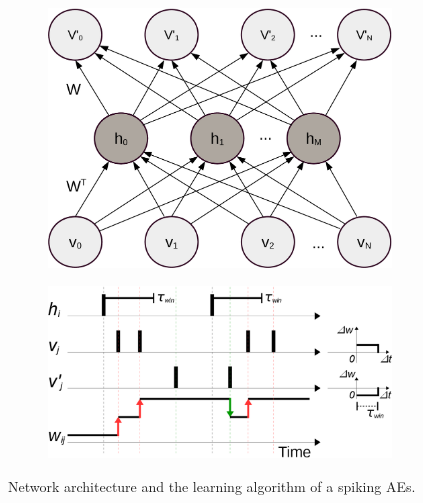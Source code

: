 \begin{figure}[th]
	\centering
	\begin{subfigure}[t]{0.35\textwidth}
		\includegraphics[width=\textwidth]{pics_sdlm/AE.png}
	\end{subfigure}
	\begin{subfigure}[t]{0.6\textwidth}
		\includegraphics[width=\textwidth]{pics_sdlm/rSTDP.png}
	\end{subfigure}
	\caption{Network architecture and the learning algorithm of a spiking AEs.}
	\label{fig:rSTDP}
\end{figure}

